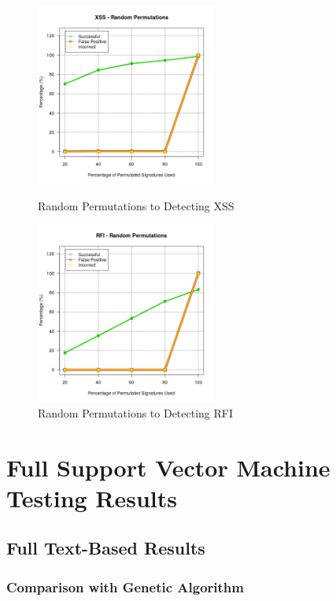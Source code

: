 \begin{appendices}
\begin{figure}[hp]
	\centering
	\includegraphics[height=225px]{./assets/appendix/fullresults/rand/Results_XSS.png}
	\caption{Random Permutations to Detecting XSS}
	\includegraphics[height=225px]{./assets/appendix/fullresults/rand/Results_RFI.png}
	\caption{Random Permutations to Detecting RFI}
\end{figure}

\chapter{Full Support Vector Machine Testing Results} \label{app:svmFullResults}

\section{Full Text-Based Results}
\subsection{Comparison with Genetic Algorithm}


\end{appendices}
